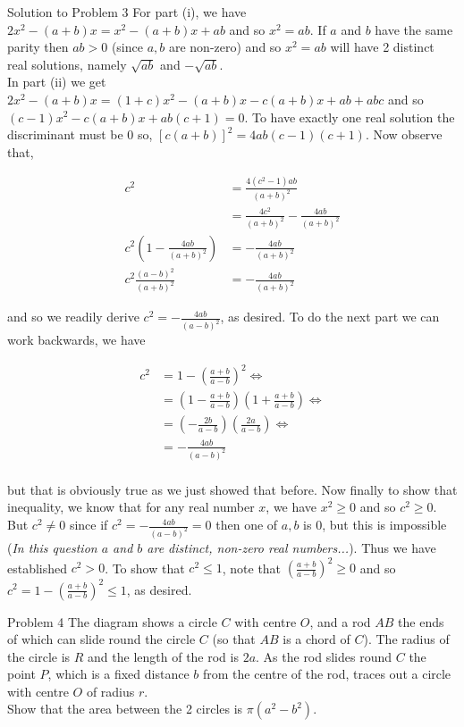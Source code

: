 \documentclass{article}
\begin{document}
\begin{solution}{Solution to Problem 3}
For part (i), we have $2x^2 - (a+b)x = x^2 - (a+b)x + ab$ and so
$x^2 = ab$. If $a$ and $b$ have the same parity then $ab > 0$ (since $a,b$
are non-zero) and so $x^2 = ab$ will have 2 distinct real solutions, namely
$\sqrt{ab}$ and $-\sqrt{ab}$.\\

In part (ii) we get $2x^2 - (a+b)x = (1+c)x^2 - (a+b)x - c(a+b)x + ab +
abc$ and so $(c-1)x^2 - c(a+b)x + ab(c+1) = 0$. To have exactly one real
solution the discriminant must be 0 so, $\left[ c(a+b) \right]^2 =
4ab(c-1)(c+1)$. Now observe that,

\[
\begin{aligned}
c^2 &= \frac{4(c^2 - 1)ab}{(a+b)^2} \\
&= \frac{4c^2}{(a+b)^2} - \frac{4ab}{(a+b)^2} \\
c^2 \left(1 - \frac{4ab}{(a+b)^2}\right) &= - \frac{4ab}{(a+b)^2}\\
c^2 \frac{(a-b)^2}{(a+b)^2} &= - \frac{4ab}{(a+b)^2}
\end{aligned}
\]

and so we readily derive $c^2 = -\frac{4ab}{(a-b)^2}$, as desired. To do
the next part we can work backwards, we have

\[
\begin{aligned}
c^2 &= 1 - \left( \frac{a+b}{a-b} \right)^2 \iff \\
&= \left(1 - \frac{a+b}{a-b}\right)\left(1 + \frac{a+b}{a-b}\right) \iff \\
&= \left( -\frac{2b}{a-b} \right) \left( \frac{2a}{a-b} \right) \iff \\
&= -\frac{4ab}{(a-b)^2}\\
\end{aligned}
\]

but that is obviously true as we just showed that before.
Now finally to show that inequality, we know that for any real number
$x$, we have $x^2 \geq 0$ and so $c^2 \geq 0$. But $c^2 \neq 0$ since if
$c^2 = -\frac{4ab}{(a-b)^2} = 0$ then one of $a,b$ is 0, but this is
impossible (\textit{In this question \(a\) and \(b\) are distinct,
non-zero real numbers...}). Thus we have established $c^2 > 0$. To show
that $c^2 \leq 1$, note that $\left( \frac{a+b}{a-b} \right)^2 \geq 0$ and
so $c^2 = 1 - \left( \frac{a+b}{a-b} \right)^2 \leq 1$, as desired.
\end{solution}
\vspace{0.2cm}
\begin{problem}{Problem 4}
The diagram shows a circle $C$ with centre $O$, and a rod $AB$ the ends of which can slide round
the circle $C$ (so that $AB$ is a chord of $C$). The radius of the circle is $R$ and the length of the
rod is $2a$.
As the rod slides round $C$ the point $P$, which is a fixed distance $b$ from the centre of the rod,
traces out a circle with centre $O$ of radius $r$.\\

Show that the area between the 2 circles is $\pi (a^2 - b^2)$.
\end{problem}
\end{document}
